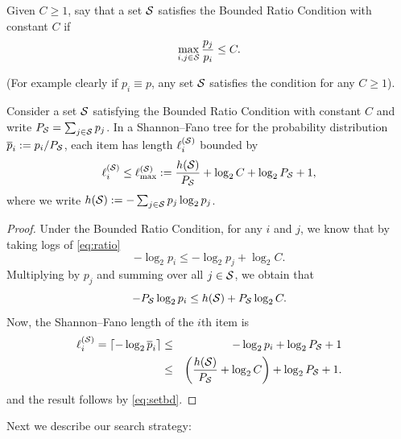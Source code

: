 \begin{condition} \label{cond:ratio}
Given $C \geq 1$, say that a set ${\mathcal{S}}$ satisfies the Bounded Ratio Condition with constant $C$ if
\begin{equation} \label{eq:ratio} \max_{i,j \in {\mathcal{S}}} \frac{p_j}{p_i} \leq C.\end{equation} \end{condition}
%
(For example clearly if $p_i \equiv p$, any set ${\mathcal{S}}$ satisfies the condition for any $C \geq 1$).
%
\begin{lemma} \label{lem:sfstep}
Consider a set ${\mathcal{S}}$ satisfying the Bounded Ratio Condition  with constant $C$
and write $P_{{\mathcal{S}}} = \sum_{j \in {\mathcal{S}}} p_j$.
In a  Shannon--Fano tree for the probability distribution $\overline{p}_i := p_i/P_{{\mathcal{S}}}$, each item has length $\ell_i^{({\mathcal{S}})}$
bounded by
\begin{equation} \label{eq:depth} \ell_i^{({\mathcal{S}})} \leq \ell_{\max}^{({\mathcal{S}})} := \frac{h({\mathcal{S}})}{P_{{\mathcal{S}}}} + \log_2  C + \log_2  P_{{\mathcal{S}}} + 1,\end{equation}
where we write $h( {\mathcal{S}}) :=  -\sum_{j \in {\mathcal{S}}} p_j \log_2  p_j$.
\end{lemma}
\begin{proof}
Under the Bounded Ratio Condition, for any $i$ and $j$, we know that by taking logs of \eqref{eq:ratio}
$$ -\log_2 p_i \leq - \log_2 p_j + \log_2 C.$$
Multiplying by $p_j$ and summing over all $j \in {\mathcal{S}}$, we obtain that
\begin{equation} \label{eq:setbd} -P_{{\mathcal{S}}} \log_2 p_i \leq h({\mathcal{S}}) + P_{{\mathcal{S}}} \log_2 C.\end{equation}
Now, the Shannon--Fano length of the $i$th item is
\begin{eqnarray}
 \ell_i^{({\mathcal{S}})}  = \lceil -\log_2 \overline{p}_i \rceil 
& \leq &  -\log_2 p_i + \log_2 P_{{\mathcal{S}}} + 1 \label{eq:lengthbd} \\
& \leq  & \left(\frac{h({\mathcal{S}})}{P_{{\mathcal{S}}}} + \log_2 C \right) + \log_2 P_{{\mathcal{S}}} + 1. \nonumber
\end{eqnarray}
and the result follows by \eqref{eq:setbd}.
\end{proof}

Next we describe our search strategy:

